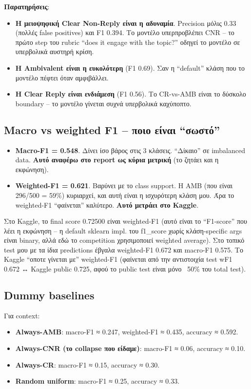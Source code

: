 \documentclass[12pt]{fphw}
\begin{document}
\textbf{Παρατηρήσεις}:

\begin{itemize}
    \item \textbf{Η μειοψηφική Clear Non-Reply είναι η αδυναμία}. Precision μόλις 0.33 (πολλές false positives) και F1 0.394. Το μοντέλο υπερπροβλέπει CNR -- το πρώτο step του rubric ``does it engage with the topic?'' οδηγεί το μοντέλο σε υπερβολικά αυστηρή κρίση.
    \item \textbf{Η Ambivalent είναι η ευκολότερη} (F1 0.69). Σαν η ``default'' κλάση που το μοντέλο πέφτει όταν αμφιβάλλει.
    \item \textbf{Η Clear Reply είναι ενδιάμεση} (F1 0.56). Το CR-vs-AMB είναι το δύσκολο boundary -- το μοντέλο γίνεται συχνά υπερβολικά καχύποπτο.
\end{itemize}

\subsection{Macro vs weighted F1 -- ποιο είναι ``σωστό''}

\begin{itemize}
    \item \textbf{Macro-F1 = 0.548}. Δίνει ίσο βάρος στις 3 κλάσεις. ``Δίκαιο'' σε imbalanced data. \textbf{Αυτό αναφέρω στο report ως κύρια μετρική} (το ζητάει και η εκφώνηση).
    \item \textbf{Weighted-F1 = 0.621}. Βαρύνει με το class support. Η ΑΜΒ (που είναι 296/500 = 59\%) κυριαρχεί, και αυτή είναι η ισχυρότερη κλάση μου. Άρα το weighted-F1 ``φαίνεται'' καλύτερο. \textbf{Αυτό μετράει στο Kaggle}.
\end{itemize}

Στο Kaggle, το final score 0.72500 είναι weighted-F1 (αυτό είναι το ``F1-score'' που λέει η εκφώνηση -- η default sklearn impl. του f1\_score χωρίς κλάση-specific args είναι binary, αλλά εδώ το competition χρησιμοποιεί weighted average). Στο τοπικό test μου με τα ίδια predictions έβγαλα weighted-F1 0.672 και macro-F1 0.575. Το Kaggle ``οποτε γίνεται με'' weighted-F1 (φαίνεται από την αντιστοιχία test wF1 0.672 ↔ Kaggle public 0.725, αφού το public test είναι μόνο ~50\% του total test).

\subsection{Dummy baselines}

Για context:

\begin{itemize}
    \item \textbf{Always-AMB}: macro-F1 ≈ 0.247, weighted-F1 ≈ 0.435, accuracy ≈ 0.592.
    \item \textbf{Always-CNR (το collapse που είδαμε)}: macro-F1 ≈ 0.06, accuracy ≈ 0.10.
    \item \textbf{Always-CR}: macro-F1 ≈ 0.15, accuracy ≈ 0.30.
    \item \textbf{Random uniform}: macro-F1 ≈ 0.25, accuracy ≈ 0.33.
\end{itemize}
\end{document}
